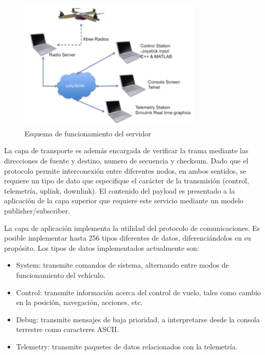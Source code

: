 \documentclass[a4paper, conference]{IEEEtran}
\begin{document}
 \begin{figure}[!t]
\centering
\includegraphics[width=3.45in]{server}
\caption{Esquema de funcionamiento del servidor}
\label{ref:server}
\end{figure}

La capa de transporte es además encargada de verificar la trama mediante las direcciones de fuente y destino, numero de secuencia y checksum. Dado que el protocolo permite interconexión entre diferentes nodos, en ambos sentidos, se requiere un tipo de dato que especifique el carácter de la transmisión (control, telemetría, uplink, downlink). El contenido del payload es presentado a la aplicación de la capa superior que requiere este servicio mediante un modelo publisher/subscriber.

La capa de aplicación implementa la utilidad del protocolo de comunicaciones. Es posible implementar hasta 256 tipos diferentes de datos, diferenciándolos en su propósito. Los tipos de datos implementados actualmente son:
\begin{itemize}
\item System: transmite comandos de sistema, alternando entre modos de funcionamiento del vehículo.
\item Control: transmite información acerca del control de vuelo, tales como cambio en la posición, navegación, acciones, etc.
\item Debug: transmite mensajes de baja prioridad, a interpretarse desde la consola terrestre como caracteres ASCII.
\item Telemetry: transmite paquetes de datos relacionados con la telemetría.
\end{itemize}



\vspace{5 mm}
\end{document}

